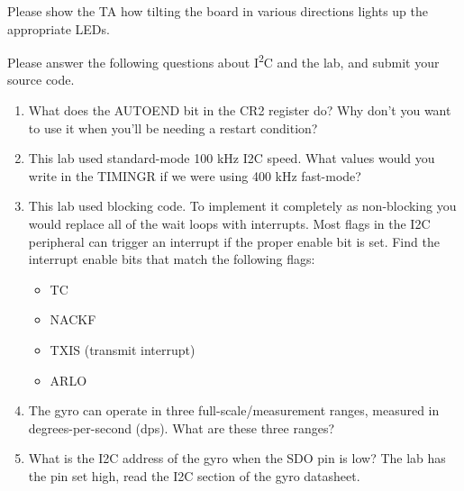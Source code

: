 \documentclass[openany,11pt,fleqn]{book} %
\begin{document}
\begin{assignment}
	Please show the TA how tilting the board in various directions lights up the appropriate LEDs.
\end{assignment}

\begin{question}[Postlab 5]
	Please answer the following questions about I\textsuperscript{2}C and the lab, and submit your source code.
	\begin{enumerate}
		\item What does the AUTOEND bit in the CR2 register do? Why don't you want to use it when you'll be needing a restart condition?
		\item This lab used standard-mode 100 kHz I2C speed. What values would you write in the TIMINGR if we were using 400 kHz fast-mode?
		\item This lab used blocking code. To implement it completely as non-blocking you would replace all of the wait loops with interrupts. Most flags in the I2C peripheral can trigger an interrupt if the proper enable bit is set. Find the interrupt enable bits that match the following flags:
		\begin{itemize}
			\item TC
			\item NACKF
			\item TXIS (transmit interrupt)
			\item ARLO
		\end{itemize}
		
		\item The gyro can operate in three full-scale/measurement ranges, measured in degrees-per-second (dps). What are these three ranges? 
		\item What is the I2C address of the gyro when the SDO pin is low? The lab has the pin set high, read the I2C section of the gyro datasheet.
	\end{enumerate}
	
\end{question}
\end{document}
